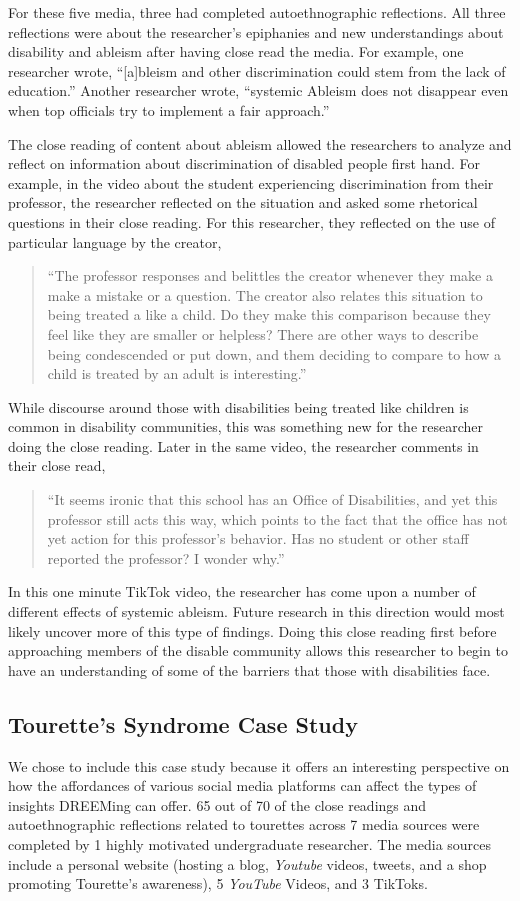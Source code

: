 For these five media, three had completed autoethnographic reflections. All three reflections were about the researcher's epiphanies and new understandings about disability and ableism after having close read the media. For example, one researcher wrote, ``[a]bleism and other discrimination could stem from the lack of education.'' Another researcher wrote, ``systemic Ableism does not disappear even when top officials try to implement a fair approach.''

The close reading of content about ableism allowed the researchers to analyze and reflect on information about discrimination of disabled people first hand. For example, in the video about the student experiencing discrimination from their professor, the researcher reflected on the situation and asked some rhetorical questions in their close reading. For this researcher, they reflected on the use of particular language by the creator,
\begin{quote}
    ``The professor responses and belittles the creator whenever they make a make a mistake or a question. The creator also relates this situation to being treated a like a child. Do they make this comparison because they feel like they are smaller or helpless? There are other ways to describe being condescended or put down, and them deciding to compare to how a child is treated by an adult is interesting.''
\end{quote}
While discourse around those with disabilities being treated like children is common in disability communities, this was something new for the researcher doing the close reading. Later in the same video, the researcher comments in their close read, 
\begin{quote}
    ``It seems ironic that this school has an Office of Disabilities, and yet this professor still acts this way, which points to the fact that the office has not yet action for this professor's behavior. Has no student or other staff reported the professor? I wonder why.''
\end{quote}
In this one minute TikTok video, the researcher has come upon a number of different effects of systemic ableism. Future research in this direction would most likely uncover more of this type of findings. Doing this close reading first before approaching members of the disable community allows this researcher to begin to have an understanding of some of the barriers that those with disabilities face.


\subsection{Tourette's Syndrome Case Study}
We chose to include this case study because it offers an interesting perspective on how the affordances of various social media platforms can affect the types of insights DREEMing can offer. 65 out of 70 of the close readings and autoethnographic reflections related to tourettes across 7 media sources were completed by 1 highly motivated undergraduate researcher. The media sources include a personal website (hosting a blog, \textit{Youtube} videos, tweets, and a shop promoting Tourette's awareness), 5 \textit{YouTube} Videos, and 3 TikToks. 

